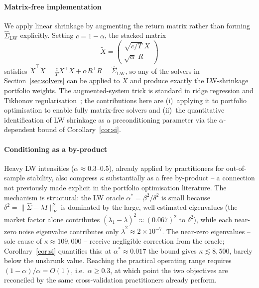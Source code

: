 \paragraph{Matrix-free implementation}
We apply linear shrinkage by augmenting the return matrix rather than forming
$\hat\Sigma_{\text{LW}}$ explicitly. Setting $c = 1-\alpha$, the stacked matrix
\[
  \tilde{X} = \begin{pmatrix} \sqrt{c/T}\;X \\ \sqrt{\alpha}\;R \end{pmatrix}
\]
satisfies $\tilde{X}^\top\tilde{X} = \frac{c}{T}X^\top X + \alpha R^\top R
= \hat\Sigma_{\text{LW}}$, so any of the solvers in Section~\ref{sec:solvers} can be
applied to $\tilde{X}$ and produce exactly the LW-shrinkage portfolio weights.
The augmented-system trick is standard in ridge regression and Tikhonov
regularisation~\cite{golub2013}; the contributions here are (i)~applying it to
portfolio optimisation to enable fully matrix-free solvers and (ii)~the
quantitative identification of LW shrinkage as a preconditioning parameter
via the $\alpha$-dependent bound of Corollary~\ref{cor:si}.

\paragraph{Conditioning as a by-product}
Heavy LW intensities ($\alpha \approx 0.3$--$0.5$), already applied by practitioners
for out-of-sample stability, also compress $\kappa$ substantially as a free by-product
-- a connection not previously made explicit in the portfolio optimisation literature.
The mechanism is structural: the LW oracle $\alpha^* = \beta^2/\delta^2$ is small
because $\delta^2 = \|\hat\Sigma - \bar\lambda I\|_F^2$ is dominated by the large,
well-estimated eigenvalues (the market factor alone contributes
$(\lambda_1 - \bar\lambda)^2 \approx (0.067)^2$ to $\delta^2$), while each near-zero
noise eigenvalue contributes only $\bar\lambda^2 \approx 2\times10^{-7}$.
The near-zero eigenvalues -- sole cause of $\kappa \approx 109{,}000$ -- receive
negligible correction from the oracle; Corollary~\ref{cor:si} quantifies this: at
$\alpha^* \approx 0.017$ the bound gives $\kappa \lesssim 8{,}500$, barely below the
unshrunk value. Reaching the practical operating range requires $(1-\alpha)/\alpha =
O(1)$, i.e.\ $\alpha \geq 0.3$, at which point the two objectives are reconciled by
the same cross-validation practitioners already perform.

